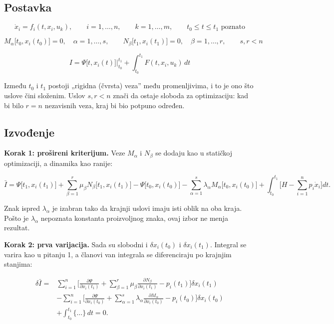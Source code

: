 \documentclass[11pt,a4paper,parskip=half,headsepline,numbers=noenddot]{scrartcl}
\begin{document}
\subsection{Postavka}

\[\dot x_i = f_i(t, x_i, u_k), \qquad i = 1, \dots, n, \qquad k = 1, \dots, m, \qquad t_0 \le t \le t_1 \text{ poznato}\]

\[M_\alpha\big[t_0, x_i(t_0)\big] = 0, \quad \alpha = 1, \dots, s, \qquad N_\beta\big[t_1, x_i(t_1)\big] = 0, \quad \beta = 1, \dots, r, \qquad s, r < n\]

\[I = \Psi\big[t, x_i(t)\big]\Big|_{t_0}^{t_1} + \int_{t_0}^{t_1}F(t, x_i, u_k)\,dt\]

Između \(t_0\) i \(t_1\) postoji „rigidna (čvrsta) veza'' među promenljivima, i to je ono što uslove čini složenim. Uslov \(s, r < n\) znači da ostaje sloboda za optimizaciju: kad bi bilo \(r = n\) nezavisnih veza, kraj bi bio potpuno određen.

\subsection{Izvođenje}

\textbf{Korak 1: prošireni kriterijum.} Veze \(M_\alpha\) i \(N_\beta\) se dodaju kao u statičkoj optimizaciji, a dinamika kao ranije:

\[\bar I = \Psi\big[t_1, x_i(t_1)\big] + \sum_{\beta=1}^r\mu_\beta N_\beta\big[t_1, x_i(t_1)\big] - \Psi\big[t_0, x_i(t_0)\big] - \sum_{\alpha=1}^s\lambda_\alpha M_\alpha\big[t_0, x_i(t_0)\big] + \int_{t_0}^{t_1}\Big[H - \sum_{i=1}^n p_i\dot x_i\Big]dt .\]

Znak ispred \(\lambda_\alpha\) je izabran tako da krajnji uslovi imaju isti oblik na oba kraja. Pošto je \(\lambda_\alpha\) nepoznata konstanta proizvoljnog znaka, ovaj izbor ne menja rezultat.

\textbf{Korak 2: prva varijacija.} Sada su slobodni i \(\delta x_i(t_0)\) i \(\delta x_i(t_1)\). Integral se varira kao u pitanju 1, a članovi van integrala se diferenciraju po krajnjim stanjima:

\[
\begin{aligned}
\delta\bar I ={}& \sum_{i=1}^n\Big[\frac{\partial\Psi}{\partial x_i(t_1)} + \sum_{\beta=1}^r\mu_\beta\frac{\partial N_\beta}{\partial x_i(t_1)} - p_i(t_1)\Big]\delta x_i(t_1) \\
&- \sum_{i=1}^n\Big[\frac{\partial\Psi}{\partial x_i(t_0)} + \sum_{\alpha=1}^s\lambda_\alpha\frac{\partial M_\alpha}{\partial x_i(t_0)} - p_i(t_0)\Big]\delta x_i(t_0) \\
&+ \int_{t_0}^{t_1}\{\dots\}\,dt = 0 .
\end{aligned}
\]
\end{document}

